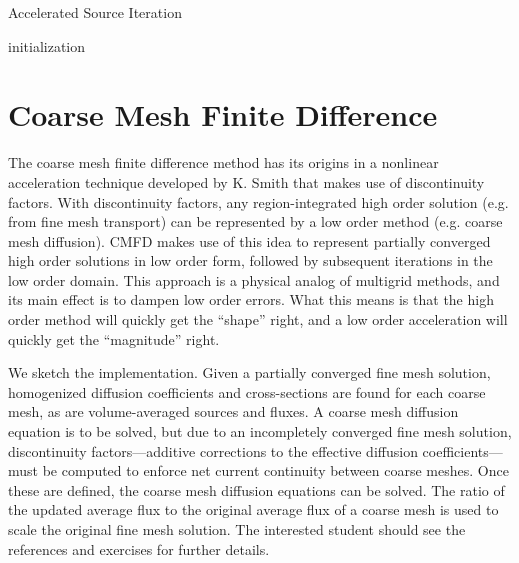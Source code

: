 \begin{algorithm}
 \label{alg:accel}
 \caption{Accelerated Source Iteration}
  initialization\;
\end{algorithm}



\section*{Coarse Mesh Finite Difference}

The coarse mesh finite difference method has its origins in a nonlinear acceleration technique developed by K. Smith that makes use of discontinuity factors.  With discontinuity factors, any region-integrated high order solution (e.g. from fine mesh transport) can be represented by a low order method (e.g. coarse mesh diffusion).  CMFD makes use of this idea to represent partially converged high order solutions in low order form, followed by subsequent iterations in the low order domain.  This approach is a physical analog of multigrid methods, and its main effect is to dampen low order errors.  What this means is that the high order method will quickly get the ``shape'' right, and a low order acceleration will quickly get the ``magnitude'' right.

We sketch the implementation.  Given a partially converged fine mesh solution, homogenized diffusion coefficients and cross-sections are found for each coarse mesh, as are volume-averaged sources and fluxes.  A coarse mesh diffusion equation is to be solved, but due to an incompletely converged fine mesh solution, discontinuity factors---additive corrections to the effective diffusion coefficients---must be computed to enforce net current continuity between coarse meshes. Once these are defined, the coarse mesh diffusion equations can be solved.  The ratio of the updated average flux to the original average flux of a coarse mesh is used to scale the original fine mesh solution.  The interested student should see the references and exercises for further details.


